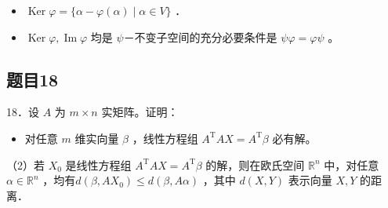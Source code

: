 \documentclass{article}
\begin{document}
\begin{itemize}
  \item[（1）] \(\operatorname{Ker} \varphi=\{\alpha-\varphi(\alpha) \mid \alpha \in V\}\) ．
  \item[（2）] \(\operatorname{Ker} \varphi, \operatorname{Im} \varphi\) 均是 \(\psi\)－不变子空间的充分必要条件是 \(\psi \varphi=\varphi \psi\) 。
\end{itemize}

\subsection{题目18}
18．设 \(A\) 为 \(m \times n\) 实矩阵。证明：

\begin{itemize}
  \item[（1）] 对任意 \(m\) 维实向量 \(\beta\) ，线性方程组 \(A^{\mathrm{T}} A X=A^{\mathrm{T}} \beta\) 必有解。
\end{itemize}

（2）若 \(X_{0}\) 是线性方程组 \(A^{\mathrm{T}} A X=A^{\mathrm{T}} \beta\) 的解，则在欧氏空间 \(\mathbb{R}^{n}\) 中，对任意 \(\alpha \in \mathbb{R}^{n}\) ，均有\(d\left(\beta, A X_{0}\right) \leq d(\beta, A \alpha)\) ，其中 \(d(X, Y)\) 表示向量 \(X, Y\) 的距离．
\end{document}
